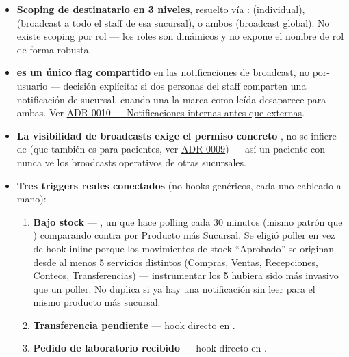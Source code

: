 \begin{itemize}
  \item \textbf{Scoping de destinatario en 3 niveles}, resuelto vía \allowbreak {}\allowbreak {}: \allowbreak {}\allowbreak {} (individual), \allowbreak {}\allowbreak {} (broadcast a todo el staff de esa sucursal), o ambos  (broadcast global). No existe scoping por rol --- los roles son dinámicos y \allowbreak {}\allowbreak {} no expone el nombre de rol de forma robusta.
  \item \textbf{ es un único flag compartido} en las notificaciones de broadcast, no por-usuario --- decisión explícita: si dos personas del staff comparten una notificación de sucursal, cuando una la marca como leída desaparece para ambas. Ver \hyperref[adr:0010]{ADR 0010 --- Notificaciones internas antes que externas}.
  \item \textbf{La visibilidad de broadcasts exige el permiso concreto \allowbreak {}\allowbreak {}}, no se infiere de \allowbreak {} (que también es  para pacientes, ver \hyperref[adr:0009]{ADR 0009}) --- así un paciente con \allowbreak {} nunca ve los broadcasts operativos de otras sucursales.
  \item \textbf{Tres triggers reales conectados} (no hooks genéricos, cada uno cableado a mano):
  \begin{enumerate}
    \item \textbf{Bajo stock} --- \allowbreak {}\allowbreak {}\allowbreak {}, un  que hace polling cada 30 minutos (mismo patrón que \allowbreak {}\allowbreak {}) comparando  contra \allowbreak {}\allowbreak {} por Producto más Sucursal. Se eligió poller en vez de hook inline porque los movimientos de stock ``Aprobado'' se originan desde al menos 5 servicios distintos (Compras, Ventas, Recepciones, Conteos, Transferencias) --- instrumentar los 5 hubiera sido más invasivo que un poller. No duplica si ya hay una notificación sin leer para el mismo producto más sucursal.
    \item \textbf{Transferencia pendiente} --- hook directo en \allowbreak {}.
    \item \textbf{Pedido de laboratorio recibido} --- hook directo en \allowbreak {}.
  \end{enumerate}
\end{itemize}

